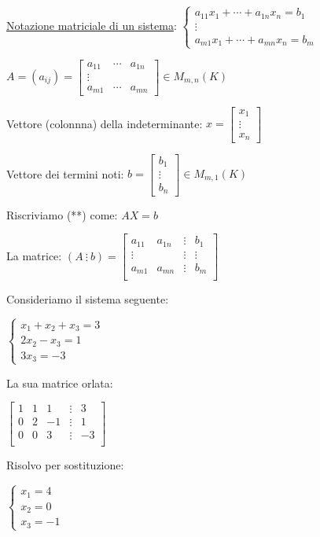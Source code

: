 \documentclass{article}
\begin{document}
\ul{Notazione matriciale di un sistema}:
$\begin{cases}
a_{11}x_1+\cdots+a_{1n}x_n=b_1\\
\vdots\\
a_{m1}x_1+\cdots+a_{mn}x_n=b_m
\end{cases}$

$A=(a_{ij})=\begin{bmatrix}
a_{11}&\cdots&a_{1n}\\
\vdots\\
a_{m1}&\cdots&a_{mn}
\end{bmatrix}\in M_{m,n}(K)$

Vettore (colonnna) della indeterminante:
$x=\begin{bmatrix}x_1\\\vdots\\x_n\end{bmatrix}$

Vettore dei termini noti: $b=\begin{bmatrix}b_1\\\vdots\\b_n\end{bmatrix}\in M_{m,1}(K)$

Riscriviamo (**) come:
$AX=b$

La matrice: $(A\ \vdots\ b)=\begin{bmatrix}
a_{11}&a_{1n}&\vdots&b_1\\
\vdots&&\vdots&\vdots\\
a_{m1}&a_{mn}&\vdots&b_m\\
\end{bmatrix}$

Consideriamo il sistema seguente:

$\begin{cases}
x_1+x_2+x_3=3\\
2x_2-x_3=1\\
3x_3=-3
\end{cases}$

La sua matrice orlata:

$\begin{bmatrix}
1&1&1&\vdots&3\\
0&2&-1&\vdots&1\\
0&0&3&\vdots&-3\\
\end{bmatrix}$

Risolvo per sostituzione:

$\begin{cases}
x_1=4\\
x_2=0\\
x_3=-1
\end{cases}$
\end{document}
